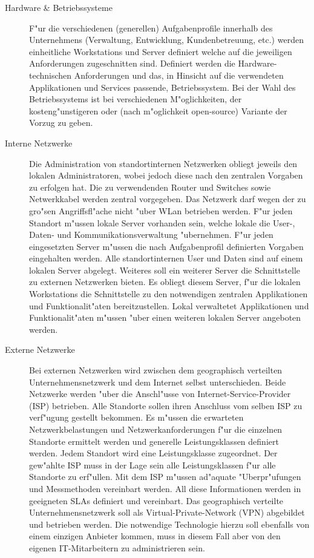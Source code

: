 \begin{description}

	\item[Hardware \& Betriebssysteme] F"ur die verschiedenen (generellen) Aufgabenprofile innerhalb des Unternehmens (Verwaltung, Entwicklung, Kundenbetreuung, etc.) werden einheitliche Workstations und Server definiert welche auf die jeweiligen Anforderungen zugeschnitten sind. Definiert werden die Hardware-technischen Anforderungen und das, in Hinsicht auf die verwendeten Applikationen und Services passende, Betriebssystem. Bei der Wahl des Betriebssystems ist bei verschiedenen M"oglichkeiten, der kosteng"unstigeren oder (nach m"oglichkeit open-source) Variante der Vorzug zu geben.
	
	\item[Interne Netzwerke] Die Administration von standortinternen Netzwerken obliegt jeweils den lokalen Administratoren, wobei jedoch diese nach den zentralen Vorgaben zu erfolgen hat. Die zu verwendenden Router und Switches sowie Netwerkkabel werden zentral vorgegeben. Das Netzwerk darf wegen der zu gro"sen Angriffsfl"ache nicht "uber WLan betrieben werden. F"ur jeden Standort m"ussen lokale Server vorhanden sein, welche lokale die User-, Daten- und Kommunikationsverwaltung "ubernehmen. F"ur jeden eingesetzten Server m"ussen die nach Aufgabenprofil definierten Vorgaben eingehalten werden. Alle standortinternen User und Daten sind auf einem lokalen Server abgelegt. Weiteres soll ein weiterer Server die Schnittstelle zu externen Netzwerken bieten. Es obliegt diesem Server, f"ur die lokalen Workstations die Schnittstelle zu den notwendigen zentralen Applikationen und Funktionalit"aten bereitzustellen. Lokal verwaltetet Applikationen und Funktionalit"aten m"ussen "uber einen weiteren lokalen Server angeboten werden.
	
	\item[Externe Netzwerke] Bei externen Netzwerken wird zwischen dem geographisch verteilten Unternehmensnetzwerk und dem Internet selbst unterschieden. Beide Netzwerke werden "uber die Anschl"usse von Internet-Service-Provider (ISP) betrieben. Alle Standorte sollen ihren Anschluss vom selben ISP zu verf"ugung gestellt bekommen. Es m"ussen die erwarteten Netzwerkbelastungen und Netzwerkanforderungen f"ur die einzelnen Standorte ermittelt werden und generelle Leistungsklassen definiert werden. Jedem Standort wird eine Leistungsklasse zugeordnet. Der gew"ahlte ISP muss in der Lage sein alle Leistungsklassen f"ur alle Standorte zu erf"ullen. Mit dem ISP m"ussen ad"aquate "Uberpr"ufungen und Messmethoden vereinbart werden. All diese Informationen werden in geeigneten SLAs definiert und vereinbart. Das geographisch verteilte Unternehmensnetzwerk soll als Virtual-Private-Network (VPN) abgebildet und betrieben werden. Die notwendige Technologie hierzu soll ebenfalls von einem einzigen Anbieter kommen, muss in diesem Fall aber von den eigenen IT-Mitarbeitern zu administrieren sein.

\end{description}

